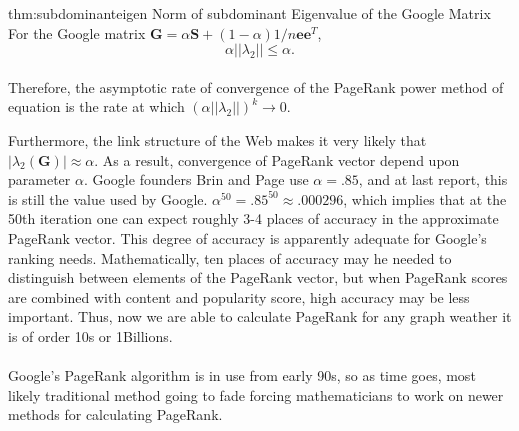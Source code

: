 \begin{thm}{thm:subdominanteigen}
	Norm of subdominant Eigenvalue of the Google Matrix
	For the Google matrix $\mathbf{G}=\alpha \mathbf{S}+(1-\alpha) 1 / n \mathbf{e e}^{T}$,
	$$
	\alpha||\lambda_{2}|| \leq \alpha .
	$$
	\\
Therefore, the asymptotic rate of convergence of the PageRank power method of equation is the rate at which $(\alpha||\lambda_{2}||)^{k} \rightarrow 0$.
\end{thm}
	
\noindent Furthermore, the link structure of the Web makes it very likely that $\left|\lambda_{2}(\mathbf{G})\right| \approx \alpha$. As a result, convergence of PageRank vector depend upon parameter $\alpha$. Google founders Brin and Page use $\alpha=.85$, and at last report, this is still the value used by Google. $\alpha^{50}=.85^{50} \approx .000296$, which implies that at the 50th iteration one can expect roughly 3-4 places of accuracy in the approximate PageRank vector. This degree of accuracy is apparently adequate for Google's ranking needs. Mathematically, ten places of accuracy may he needed to distinguish between elements of the PageRank vector, but when PageRank scores are combined with content and popularity score, high accuracy may be less important. Thus, now we are able to calculate PageRank for any graph weather it is of order 10s or 1Billions.\\
\\
\noindent Google's PageRank algorithm is in use from early 90s, so as time goes, most likely traditional method going to fade forcing mathematicians to work on newer methods for calculating PageRank.